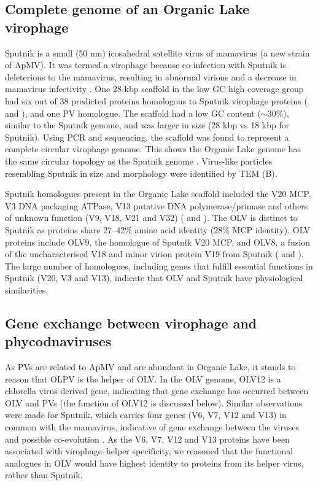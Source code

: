 \subsection{Complete genome of an Organic Lake virophage}
Sputnik is a small (50 nm) icosahedral satellite virus of mamavirus (a new strain of \ac{ApMV}). 
It was termed a virophage because co-infection with Sputnik is deleterious to the mamavirus, resulting in abnormal virions and a decrease in mamavirus infectivity \cite{LaScola2008}. 
One 28 kbp scaffold in the low GC high coverage group had six out of 38 predicted proteins homologous to Sputnik virophage proteins ( and ), and one \ac{PV} homologue. 
The scaffold had a low GC content ($\sim$30\%), similar to the Sputnik genome, and was larger in size (28 kbp vs 18 kbp for Sputnik). 
Using \ac{PCR} and sequencing, the scaffold was found to represent a complete circular virophage genome.
This shows the Organic Lake genome has the same circular topology as the Sputnik genome \cite{LaScola2008}. 
Virus-like particles resembling Sputnik in size and morphology were identified by \ac{TEM} (B).



Sputnik homologues present in the Organic Lake scaffold included the V20 \ac{MCP}, V3 \textsc{DNA} packaging \textsc{ATP}ase, V13 putative \textsc{DNA} polymerase/primase and others of unknown function (V9, V18, V21 and V32) ( and ). 
The \ac{OLV} is distinct to Sputnik as proteins share 27--42\% amino acid identity (28\% \ac{MCP} identity). 
\ac{OLV} proteins include OLV9, the homologue of Sputnik V20 \ac{MCP}, and OLV8, a fusion of the uncharacterised V18 and minor virion protein V19 from Sputnik ( and ). 
The large number of homologues, including genes that fulfill essential functions in Sputnik (V20, V3 and V13), indicate that \ac{OLV} and Sputnik have physiological similarities. 

\subsection{Gene exchange between virophage and phycodnaviruses}

As \acp{PV} are related to \ac{ApMV} \cite{Iyer2006} and are abundant in Organic Lake, it stands to reason that \ac{OLPV} is the helper of \ac{OLV}. 
In the \ac{OLV} genome, OLV12 is a chlorella virus-derived gene, indicating that gene exchange has occurred between \ac{OLV} and \acp{PV} (the function of OLV12 is discussed below).
Similar observations were made for Sputnik, which carries four genes (V6, V7, V12 and V13) in common with the mamavirus, indicative of gene exchange between the viruses and possible co-evolution \cite{LaScola2008}. 
As the V6, V7, V12 and V13 proteins have been associated with virophage--helper specificity, we reasoned that the functional analogues in \ac{OLV} would have highest identity to proteins from its helper virus, rather than Sputnik. 

